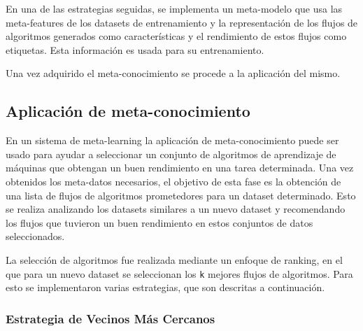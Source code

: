En una de las estrategias seguidas, se implementa un meta-modelo que usa las meta-features de los datasets de entrenamiento y la representación de los flujos de algoritmos generados como características y el rendimiento de estos flujos como etiquetas. Esta información es usada para su entrenamiento.

Una vez adquirido el meta-conocimiento se procede a la aplicación del mismo.

\subsection{Aplicación de meta-conocimiento}\label{sub:aplicacion}


En un sistema de meta-learning la aplicación de meta-conocimiento puede ser usado para ayudar a seleccionar un conjunto de algoritmos de aprendizaje de máquinas que obtengan un buen rendimiento en una tarea determinada. Una vez obtenidos los meta-datos necesarios, el objetivo de esta fase es la obtención de una lista de flujos de algoritmos prometedores para un dataset determinado. Esto se realiza analizando los datasets similares a un nuevo dataset y recomendando los flujos que tuvieron un buen rendimiento en estos conjuntos de datos seleccionados. 

La selección de algoritmos fue realizada mediante un enfoque de ranking, en el que para un nuevo dataset se seleccionan los \texttt{k} mejores flujos de algoritmos. Para esto se implementaron varias estrategias, que son descritas a continuación.

\subsubsection{Estrategia de Vecinos Más Cercanos}\label{subsub:nn}


